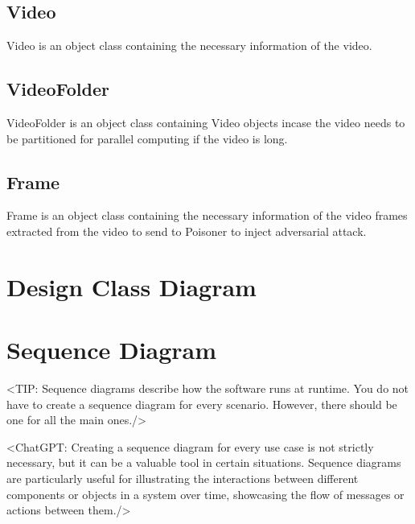 \subsection{Video}
Video is an object class containing the necessary information of the video.

\subsection{VideoFolder}
VideoFolder is an object class containing Video objects incase the video needs to be partitioned for parallel computing if the video is long.

\subsection{Frame}
Frame is an object class containing the necessary information of the video frames extracted from the video to send to Poisoner to inject adversarial attack.


\section{Design Class Diagram}


\section{Sequence Diagram}
\label{section:sequence-diagram}
<TIP: Sequence diagrams describe how the software runs at runtime.
You do not have to create a sequence diagram for every scenario. However,
there should be one for all the main ones./>

<ChatGPT: Creating a sequence diagram for every use case is not
strictly necessary, but it can be a valuable tool in certain situations. Sequence
diagrams are particularly useful for illustrating the interactions between different
components or objects in a system over time, showcasing the flow of messages
or actions between them./>